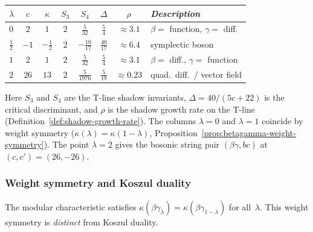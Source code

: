 \begin{computation}
\label{comp:betagamma-shadow-weights}
\begin{center}
\small
\renewcommand{\arraystretch}{1.35}
\begin{tabular}{l c c c c c c l}
\toprule
$\lambda$ & $c$ & $\kappa$ & $S_3$ & $S_4$ & $\Delta$ & $\rho$
 & \emph{Description} \\
\midrule
$0$ & $2$ & $1$ & $2$ & $\frac{5}{32}$ & $\frac{5}{4}$ & $\approx 3.1$
 & $\beta =$ function, $\gamma =$ diff. \\[2pt]
$\frac{1}{2}$ & $-1$ & $-\frac{1}{2}$ & $2$ & $-\frac{10}{17}$ & $\frac{40}{17}$ & $\approx 6.4$
 & symplectic boson \\[2pt]
$1$ & $2$ & $1$ & $2$ & $\frac{5}{32}$ & $\frac{5}{4}$ & $\approx 3.1$
 & $\beta =$ diff., $\gamma =$ function \\[2pt]
$2$ & $26$ & $13$ & $2$ & $\frac{5}{1976}$ & $\frac{5}{19}$ & $\approx 0.23$
 & quad.\ diff.\ / vector field \\
\bottomrule
\end{tabular}
\end{center}
Here $S_3$ and $S_4$ are the T-line shadow invariants,
$\Delta = 40/(5c+22)$ is the critical discriminant, and
$\rho$ is the shadow growth rate on the T-line
(Definition~\textup{\ref{def:shadow-growth-rate}}).
The columns $\lambda = 0$ and $\lambda = 1$ coincide by
weight symmetry ($\kappa(\lambda) = \kappa(1{-}\lambda)$,
Proposition~\textup{\ref{prop:betagamma-weight-symmetry}}).
The point $\lambda = 2$ gives the bosonic string pair
$(\beta\gamma, bc)$ at $(c, c') = (26, -26)$.
\end{computation}

\subsubsection{Weight symmetry and Koszul duality}

\begin{proposition}
\label{prop:betagamma-weight-symmetry}
The modular characteristic satisfies
$\kappa(\beta\gamma_\lambda) = \kappa(\beta\gamma_{1-\lambda})$
for all~$\lambda$. This weight symmetry is \emph{distinct} from
Koszul duality.
\end{proposition}

